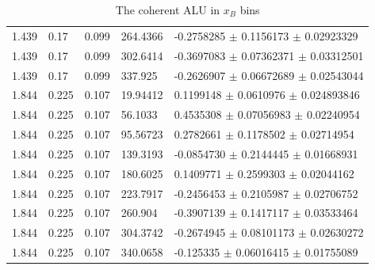 \begin{table}[!h]
\begin{center}
\begin{tabular}{||l|l|l|l|l||}
        1.439 & 0.17 & 0.099 &    264.4366   &   -0.2758285  $\pm$   0.1156173     $\pm$   0.02923329    \\
        1.439 & 0.17 & 0.099 &    302.6414   &   -0.3697083  $\pm$   0.07362371    $\pm$   0.03312501    \\
        1.439 & 0.17 & 0.099 &    337.925    &   -0.2626907  $\pm$   0.06672689    
         $\pm$   0.02543044    \\             
         \hline                                                                         
         1.844 & 0.225 & 0.107 &   19.94412   &    0.1199148  $\pm$   0.0610976     
         $\pm$   0.024893846   \\
        1.844 & 0.225 & 0.107 &   56.1033    &    0.4535308  $\pm$   0.07056983    $\pm$   0.02240954    \\
        1.844 & 0.225 & 0.107 &   95.56723   &    0.2782661  $\pm$   0.1178502     $\pm$   0.02714954    \\
        1.844 & 0.225 & 0.107 &   139.3193   &   -0.0854730  $\pm$   0.2144445     $\pm$   0.01668931    \\
        1.844 & 0.225 & 0.107 &   180.6025   &    0.1409771  $\pm$   0.2599303     $\pm$   0.02044162    \\
        1.844 & 0.225 & 0.107 &   223.7917   &   -0.2456453  $\pm$   0.2105987     $\pm$   0.02706752    \\
        1.844 & 0.225 & 0.107 &   260.904    &   -0.3907139  $\pm$   0.1417117     $\pm$   0.03533464    \\
        1.844 & 0.225 & 0.107 &   304.3742   &   -0.2674945  $\pm$   0.08101173    $\pm$   0.02630272    \\
        1.844 & 0.225 & 0.107 &   340.0658   &   -0.125335   $\pm$   0.06016415    $\pm$   0.01755089    \\
         \hline  \hline
      \end{tabular}
      \caption{The coherent ALU in $x_B$ bins}
      \label{table:Coh_xB_BSA}
   \end{center}
\end{table}                        

